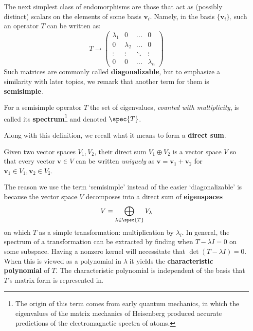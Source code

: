 		The next simplest class of endomorphisms are those that act as (possibly distinct) scalars on the elements of some basis $\mathbf v_i$. Namely, in the basis $\{ \mathbf v_i \}$, such an operator $T$ can be written as:
		\begin{equation}T \to
			\begin{pmatrix}
				\lambda_1 & 0 & \dots & 0\\
				0 & \lambda_2 & \dots & 0\\
				\vdots & \vdots & \ddots & \vdots\\
				0 & 0 & \dots & \lambda_n
			\end{pmatrix}
		\end{equation}
		Such matrices are commonly called \textbf{diagonalizable}, but to emphasize a similarity with later topics, we remark that another term for them is \textbf{semisimple}. 
		\begin{defn}
		For a semisimple operator $T$ the set of eigenvalues, \emph{counted with multiplicity}, is called its \textbf{spectrum}\footnote{The origin of this term comes from early quantum mechanics, in which the eigenvalues of the matrix mechanics of Heisenberg produced accurate predictions of the electromagnetic spectra of atoms.} and denoted $\spec{T}$.
		\end{defn}
		Along with this definition, we recall what it means to form a \textbf{direct sum}. 
		\begin{defn}
			Given two vector spaces $V_1, V_2$, their direct sum $V_1 \oplus V_2$ is a vector space $V$ so that every vector $\mathbf v \in V$ can be written \emph{uniquely} as $\mathbf v = \mathbf v_1 + \mathbf v_2$ for $\mathbf v_1 \in V_1, \mathbf v_2 \in V_2$.
		\end{defn}
		The reason we use the term `semisimple' instead of the easier `diagonalizable' is because the vector space $V$ decomposes into a direct sum of \textbf{eigenspaces}
		\begin{equation}
			V = \bigoplus_{\lambda \in \spec{T}} V_{\lambda}
		\end{equation}
		 on which $T$ as a simple transformation: multiplication by $\lambda_i$. In general, the spectrum of a transformation can be extracted by finding when $T - \lambda I = 0$ on some subspace. Having a nonzero kernel will necessitate that $\det (T - \lambda I) = 0$. When this is viewed as a polynomial in $\lambda$ it yields the \textbf{characteristic polynomial} of $T$. The characteristic polynomial is independent of the basis that $T$'s matrix form is represented in.
		
